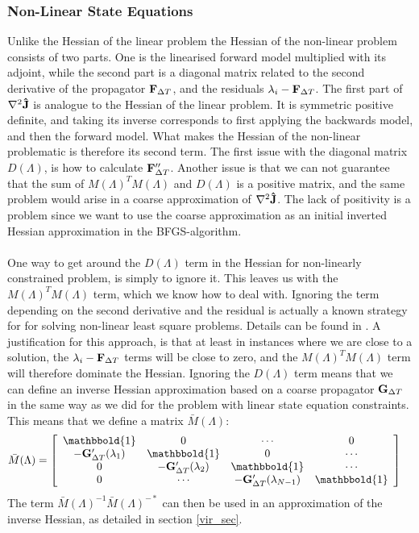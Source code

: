 \subsubsection{Non-Linear State Equations}
Unlike the Hessian of the linear problem the Hessian of the non-linear problem consists of two parts. One is the linearised forward model multiplied with its adjoint, while the second part is a diagonal matrix related to the second derivative of the propagator $\bold F_{\Delta T}$, and the residuals $\lambda_i-\bold F_{\Delta T}$. The first part of $\nabla^2 \bold{\hat{J}}$ is analogue to the Hessian of the linear problem. It is symmetric positive definite, and taking its inverse corresponds to first applying the backwards model, and then the forward model. What makes the Hessian of the non-linear problematic is therefore its second term. The first issue with the diagonal matrix $D(\Lambda)$, is how to calculate $\bold F_{\Delta T}''$. Another issue is that we can not guarantee that the sum of $M(\Lambda)^TM(\Lambda)$ and $D(\Lambda)$ is a positive matrix, and the same problem would arise in a coarse approximation of $\nabla^2 \bold{\hat{J}}$. The lack of positivity is a problem since we want to use the coarse approximation as an initial inverted Hessian approximation in the BFGS-algorithm.
\\
\\
One way to get around the $D(\Lambda)$ term in the Hessian for non-linearly constrained problem, is simply to ignore it. This leaves us with the $M(\Lambda)^TM(\Lambda)$ term, which we know how to deal with. Ignoring the term depending on the second derivative and the residual is actually a known strategy for for solving non-linear least square problems. Details can be found in \cite{nocedal2006numerical}. A justification for this approach, is that at least in instances where we are close to a solution, the $\lambda_i-\bold F_{\Delta T}$ terms will be close to zero, and the $M(\Lambda)^TM(\Lambda)$ term will therefore dominate the Hessian. Ignoring the $D(\Lambda)$ term means that we can define an inverse Hessian approximation based on a coarse propagator $\bold G_{\Delta T}$ in the same way as we did for the problem with linear state equation constraints. This means that we define a matrix $\bar M(\Lambda)$:
\begin{align}
\bar M(\Lambda) &= \left[ \begin{array}{cccc}
   \mathbbold{1} & 0 & \cdots & 0 \\  
   -\bold{G}_{\Delta T}'(\lambda_{1}) & \mathbbold{1} & 0 & \cdots \\ 
   0 &-\bold{G}_{\Delta T}'(\lambda_{2}) & \mathbbold{1}  & \cdots \\
   0 &\cdots &-\bold{G}_{\Delta T}'(\lambda_{N-1}) & \mathbbold{1}  \\
   \end{array}  \right] \label{ppc_linearized}
\end{align}
The term $\bar{M}(\Lambda)^{-1}\bar{M}(\Lambda)^{-*}$ can then be used in an approximation of the inverse Hessian, as detailed in section \ref{vir_sec}.
